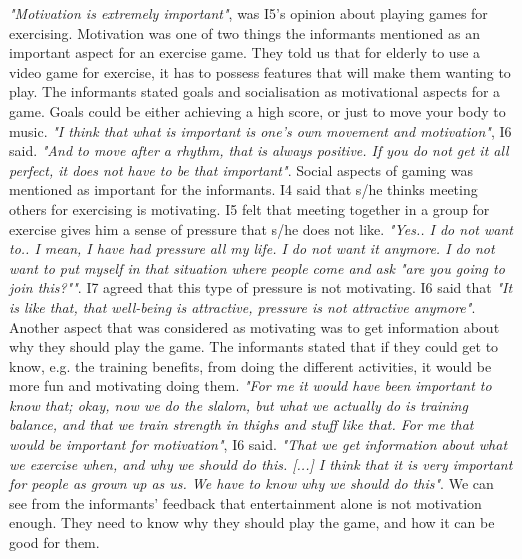 \emph{"Motivation is extremely important"}, was I5's opinion about playing games for exercising. Motivation was one of two things the informants mentioned as an important aspect for an exercise game. They told us that for elderly to use a video game for exercise, it has to possess features that will make them wanting to play. The informants stated goals and socialisation as motivational aspects for a game. Goals could be either achieving a high score, or just to move your body to music. \emph{"I think that what is important is one's own movement and motivation"}, I6 said. \emph{"And to move after a rhythm, that is always positive. If you do not get it all perfect, it does not have to be that important"}. Social aspects of gaming was mentioned as important for the informants. I4 said that s/he thinks meeting others for exercising is motivating. I5 felt that meeting together in a group for exercise gives him a sense of pressure that s/he does not like. \emph{"Yes.. I do not want to.. I mean, I have had pressure all my life. I do not want it anymore. I do not want to put myself in that situation where people come and ask "are you going to join this?""}. I7 agreed that this type of pressure is not motivating. I6 said that \emph{"It is like that, that well-being is attractive, pressure is not attractive anymore"}.  Another aspect that was considered as motivating was to get information about why they should play the game. The informants stated that if they could get to know, e.g. the training benefits, from doing the different activities, it would be more fun and motivating doing them. \emph{"For me it would have been important to know that; okay, now we do the slalom, but what we actually do is training balance, and that we train strength in thighs and stuff like that. For me that would be important for motivation"}, I6 said. \emph{"That we get information about what we exercise when, and why we should do this. [...] I think that it is very important for people as grown up as us. We have to know why we should do this"}. We can see from the informants' feedback that entertainment alone is not motivation enough. They need to know why they should play the game, and how it can be good for them. 

